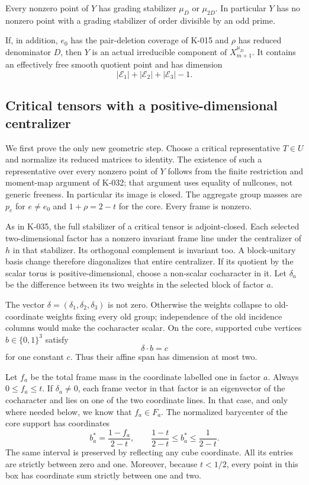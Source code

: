 \begin{theorem}[K-036]
Every nonzero point of $Y$ has grading stabilizer $\mu_D$ or
$\mu_{2D}$.  In particular $Y$ has no nonzero point with a grading
stabilizer of order divisible by an odd prime.

If, in addition, $e_0$ has the pair-deletion coverage of K-015
and $\rho$ has reduced denominator $D$, then $Y$ is an actual
irreducible component of $X_{m+1}^{\mu_D}$.  It contains an
effectively free smooth quotient point and has dimension
\[
                       |\mathcal E_1|+|\mathcal E_2|
                                  +|\mathcal E_3|-1.    \tag{K-036c}
\]
\end{theorem}

\subsection*{Critical tensors with a positive-dimensional centralizer}

We first prove the only new geometric step.  Choose a critical
representative $T\in U$ and normalize its reduced matrices to
identity.  The existence of such a representative over every
nonzero point of $Y$ follows from the finite restriction and
moment-map argument of K-032; that argument uses equality of
nullcones, not generic freeness.  In particular its image is
closed.  The aggregate group masses are $p_e$ for $e\ne e_0$
and $1+\rho=2-t$ for the core.  Every frame is nonzero.

As in K-035, the full stabilizer of a critical tensor is
adjoint-closed.  Each selected two-dimensional factor has a
nonzero invariant frame line under the centralizer of $h$ in
that stabilizer.  Its orthogonal complement is invariant too.
A block-unitary basis change therefore diagonalizes that entire
centralizer.  If its quotient by the scalar torus is
positive-dimensional, choose a non-scalar cocharacter in it.
Let $\delta_a$ be the difference between its two weights in
the selected block of factor $a$.

The vector $\delta=(\delta_1,\delta_2,\delta_3)$ is not zero.
Otherwise the weights collapse to old-coordinate weights fixing
every old group; independence of the old incidence columns
would make the cocharacter scalar.  On the core, supported cube
vertices $b\in\{0,1\}^3$ satisfy
\[
                              \delta\cdot b=c           \tag{K-036d}
\]
for one constant $c$.  Thus their affine span has dimension at
most two.

Let $f_a$ be the total frame mass in the coordinate labelled
one in factor $a$.  Always $0\le f_a\le t$.  If
$\delta_a\ne0$, each frame vector in that factor is an
eigenvector of the cocharacter and lies on one of the two
coordinate lines.  In that case, and only where needed below,
we know that $f_a\in F_a$.  The normalized barycenter of the
core support has coordinates
\[
              b_a^*=\frac{1-f_a}{2-t},\qquad
       \frac{1-t}{2-t}\le b_a^*\le\frac1{2-t}.          \tag{K-036e}
\]
The same interval is preserved by reflecting any cube coordinate.
All its entries are strictly between zero and one.  Moreover,
because $t<1/2$, every point in this box has coordinate sum
strictly between one and two.

